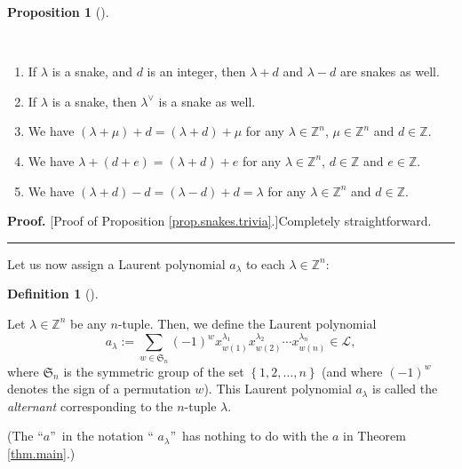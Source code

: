 \documentclass[numbers=enddot,12pt,final,onecolumn,notitlepage]{scrartcl}%
\theoremstyle{definition}
\newtheorem{prop}[theo]{Proposition}
\newenvironment{proposition}[1][]
{\begin{prop}[#1]\begin{leftbar}}
{\end{leftbar}\end{prop}}
\newtheorem{defi}[theo]{Definition}
\newenvironment{definition}[1][]
{\begin{defi}[#1]\begin{leftbar}}
{\end{leftbar}\end{defi}}
\newenvironment{proof}[1][Proof]{\noindent\textbf{#1.} }{\ \rule{0.5em}{0.5em}}
\let\sumnonlimits\sum
\renewcommand{\sum}{\sumnonlimits\limits}
\begin{document}
\begin{proposition}
\label{prop.snakes.trivia}\ \ 

\begin{enumerate}
\item[\textbf{(a)}] If $\lambda$ is a snake, and $d$ is an integer, then
$\lambda+d$ and $\lambda-d$ are snakes as well.

\item[\textbf{(b)}] If $\lambda$ is a snake, then $\lambda^{\vee}$ is a snake
as well.

\item[\textbf{(c)}] We have $\left(  \lambda+\mu\right)  +d=\left(
\lambda+d\right)  +\mu$ for any $\lambda\in\mathbb{Z}^{n}$, $\mu\in
\mathbb{Z}^{n}$ and $d\in\mathbb{Z}$.

\item[\textbf{(d)}] We have $\lambda+\left(  d+e\right)  =\left(
\lambda+d\right)  +e$ for any $\lambda\in\mathbb{Z}^{n}$, $d\in\mathbb{Z}$ and
$e\in\mathbb{Z}$.

\item[\textbf{(e)}] We have $\left(  \lambda+d\right)  -d=\left(
\lambda-d\right)  +d=\lambda$ for any $\lambda\in\mathbb{Z}^{n}$ and
$d\in\mathbb{Z}$.
\end{enumerate}
\end{proposition}

\begin{proof}
[Proof of Proposition \ref{prop.snakes.trivia}.]Completely straightforward.
\end{proof}

Let us now assign a Laurent polynomial $a_{\lambda}$ to each $\lambda
\in\mathbb{Z}^{n}$:

\begin{definition}
\label{def.alt}Let $\lambda\in\mathbb{Z}^{n}$ be any $n$-tuple. Then, we
define the Laurent polynomial%
\[
a_{\lambda}:=\sum_{w\in\mathfrak{S}_{n}}\left(  -1\right)  ^{w}x_{w\left(
1\right)  }^{\lambda_{1}}x_{w\left(  2\right)  }^{\lambda_{2}}\cdots
x_{w\left(  n\right)  }^{\lambda_{n}}\in\mathcal{L},
\]
where $\mathfrak{S}_{n}$ is the symmetric group of the set $\left\{
1,2,\ldots,n\right\}  $ (and where $\left(  -1\right)  ^{w}$ denotes the sign
of a permutation $w$). This Laurent polynomial $a_{\lambda}$ is called the
\emph{alternant} corresponding to the $n$-tuple $\lambda$.
\end{definition}

(The \textquotedblleft$a$\textquotedblright\ in the notation \textquotedblleft%
$a_{\lambda}$\textquotedblright\ has nothing to do with the $a$ in Theorem
\ref{thm.main}.)
\end{document}
